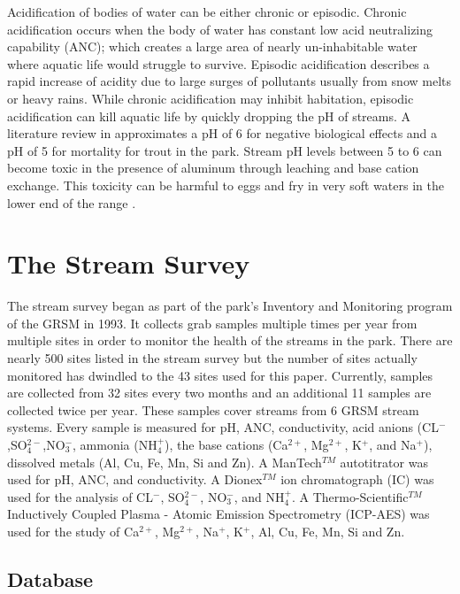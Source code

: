 Acidification of bodies of water can be either chronic or episodic. 
Chronic acidification occurs when the body of water has constant low acid neutralizing capability (ANC); which creates a large area of  nearly un-inhabitable water where aquatic life would struggle to survive. 
Episodic acidification describes a rapid increase of acidity due to large surges of pollutants usually from snow melts or heavy rains.  
While chronic acidification may inhibit habitation, episodic acidification can kill aquatic life by quickly dropping the pH of streams.
A literature review in \citet{neff2009physiological} approximates a pH of 6 for negative biological effects and a pH of 5 for mortality for trout in the park.  
Stream pH levels between 5 to 6 can become toxic in the presence of aluminum through leaching and base cation exchange.
This toxicity can be harmful to eggs and fry in very soft waters in the lower end of the range \citep{robinson2008ph}.  

\section{The Stream Survey}  %

The stream survey began as part of the park's Inventory and Monitoring program of the GRSM in 1993.
It collects grab samples multiple times per year from multiple sites in order to monitor the health of the streams in the park.
There are nearly 500 sites listed in the stream survey but the number of sites actually monitored has dwindled to the 43 sites used for this paper.
Currently, samples are collected from 32 sites every two months and an additional 11 samples are collected twice per year.  
These samples cover streams from 6 GRSM stream systems. 
Every sample is  measured for pH, ANC, conductivity, acid anions (CL$^-$,SO$_4^{2-}$,NO$_3^-$, ammonia (NH$_4^+$), the base cations (Ca$^{2+}$, Mg$^{2+}$, K$^+$, and Na$^+$), dissolved metals (Al, Cu, Fe, Mn, Si and Zn).  
A ManTech$^{TM}$ autotitrator was used for pH, ANC, and conductivity.  
A Dionex$^{TM}$ ion chromatograph (IC) was used for the analysis of CL$^-$, SO$_4^{2-}$, NO$_3^-$, and NH$_4^+$.  
A Thermo-Scientific$^{TM}$ Inductively Coupled Plasma - Atomic Emission Spectrometry (ICP-AES) was used for the study of Ca$^{2+}$, Mg$^{2+}$, Na$^+$, K$^+$, Al, Cu, Fe, Mn, Si and Zn.

\subsection{Database}%


